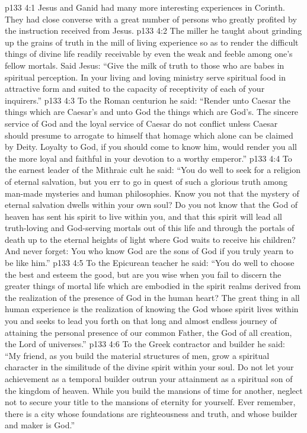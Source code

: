\vs p133 4:1 Jesus and Ganid had many more interesting experiences in Corinth. They had close converse with a great number of persons who greatly profited by the instruction received from Jesus.
\vs p133 4:2 \pc The miller he taught about grinding up the grains of truth in the mill of living experience so as to render the difficult things of divine life readily receivable by even the weak and feeble among one’s fellow mortals. Said Jesus: \textcolor{ubdarkred}{“Give the milk of truth to those who are babes in spiritual perception. In your living and loving ministry serve spiritual food in attractive form and suited to the capacity of receptivity of each of your inquirers.”}
\vs p133 4:3 \pc To the Roman centurion he said: \textcolor{ubdarkred}{“Render unto Caesar the things which are Caesar’s and unto God the things which are God’s. The sincere service of God and the loyal service of Caesar do not conflict unless Caesar should presume to arrogate to himself that homage which alone can be claimed by Deity. Loyalty to God, if you should come to know him, would render you all the more loyal and faithful in your devotion to a worthy emperor.”}
\vs p133 4:4 \pc To the earnest leader of the Mithraic cult he said: \textcolor{ubdarkred}{“You do well to seek for a religion of eternal salvation, but you err to go in quest of such a glorious truth among man\hyp{}made mysteries and human philosophies. Know you not that the mystery of eternal salvation dwells within your own soul? Do you not know that the God of heaven has sent his spirit to live within you, and that this spirit will lead all truth\hyp{}loving and God\hyp{}serving mortals out of this life and through the portals of death up to the eternal heights of light where God waits to receive his children? And never forget: You who know God are the sons of God if you truly yearn to be like him.”}
\vs p133 4:5 \pc To the Epicurean teacher he said: \textcolor{ubdarkred}{“You do well to choose the best and esteem the good, but are you wise when you fail to discern the greater things of mortal life which are embodied in the spirit realms derived from the realization of the presence of God in the human heart? The great thing in all human experience is the realization of knowing the God whose spirit lives within you and seeks to lead you forth on that long and almost endless journey of attaining the personal presence of our common Father, the God of all creation, the Lord of universes.”}
\vs p133 4:6 \pc To the Greek contractor and builder he said: \textcolor{ubdarkred}{“My friend, as you build the material structures of men, grow a spiritual character in the similitude of the divine spirit within your soul. Do not let your achievement as a temporal builder outrun your attainment as a spiritual son of the kingdom of heaven. While you build the mansions of time for another, neglect not to secure your title to the mansions of eternity for yourself. Ever remember, there is a city whose foundations are righteousness and truth, and whose builder and maker is God.”}
